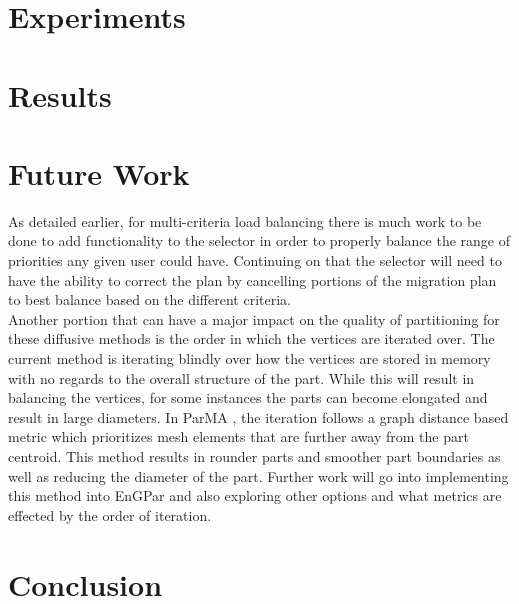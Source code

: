 \documentclass[a4paper]{article}
\begin{document}
\section{Experiments}

\section{Results}

\section{Future Work}
As detailed earlier, for multi-criteria load balancing there is much work to be done to add functionality to the selector in order to properly balance the range of priorities any given user could have. Continuing on that the selector will need to have the ability to correct the plan by cancelling portions of the migration plan to best balance based on the different criteria. \\
Another portion that can have a major impact on the quality of partitioning for these diffusive methods is the order in which the vertices are iterated over. The current method is iterating blindly over how the vertices are stored in memory with no regards to the overall structure of the part. While this will result in balancing the vertices, for some instances the parts can become elongated and result in large diameters. In ParMA \cite{Smith2015}, the iteration follows a graph distance based metric which prioritizes mesh elements that are further away from the part centroid. This method results in rounder parts and smoother part boundaries as well as reducing the diameter of the part. Further work will go into implementing this method into EnGPar and also exploring other options and what metrics are effected by the order of iteration.


\section{Conclusion}


\newpage 

%
\end{document}
